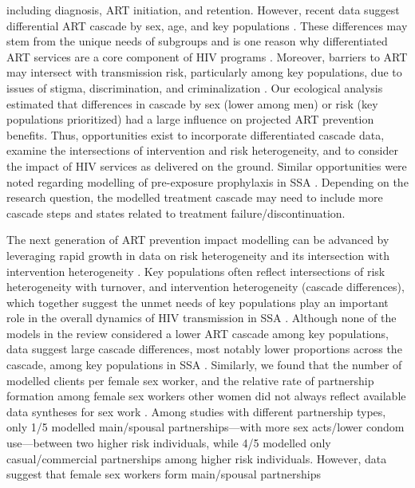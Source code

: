 including diagnosis, ART initiation, and retention.
However, recent data suggest differential ART cascade by sex, age, and key populations
\cite{Lancaster2016,Stannah2019,Ma2020,Green2020}.
These differences may stem from the unique needs of subgroups
and is one reason why differentiated ART services are a core component of HIV programs
\cite{Chikwari2018,Ehrenkranz2019}.
Moreover, barriers to ART may intersect with transmission risk, particularly among key populations,
due to issues of stigma, discrimination, and criminalization \cite{Ortblad2019,Baral2019}.
Our ecological analysis estimated that
differences in cascade by sex (lower among men) or risk (key populations prioritized)
had a large influence on projected ART prevention benefits.
Thus, opportunities exist to incorporate differentiated cascade data,
examine the intersections of intervention and risk heterogeneity, and
to consider the impact of HIV services as delivered on the ground.
Similar opportunities were noted regarding modelling of pre-exposure prophylaxis in SSA \cite{Case2019}.
Depending on the research question, the modelled treatment cascade may need
to include more cascade steps and states related to treatment failure/discontinuation.
\par
The next generation of ART prevention impact modelling can be advanced by leveraging
rapid growth in data on risk heterogeneity and its intersection with intervention heterogeneity
\cite{Beyrer2012,Baral2012,Mishra2016}.
Key populations often reflect intersections of risk heterogeneity with turnover,
and intervention heterogeneity (cascade differences),
which together suggest the unmet needs of key populations
play an important role in the overall dynamics of HIV transmission in SSA \cite{Bekker2015,Stone2021}.
Although none of the models in the review considered a lower ART cascade among key populations,
data suggest large cascade differences, most notably lower proportions across the cascade,
among key populations in SSA \cite{Mountain2014sr,Hakim2018,Stannah2019}.
Similarly, we found that the number of modelled clients per female sex worker, and
the relative rate of partnership formation among female sex workers \vs other women
did not always reflect available data syntheses for sex work \cite{Watts2010,Scorgie2012}.
Among studies with different partnership types, only 1/5 modelled
main/spousal partnerships---with more sex acts/lower condom use---between two higher risk individuals,
while 4/5 modelled only casual/commercial partnerships among higher risk individuals.
However, data suggest that female sex workers form main/spousal partnerships
